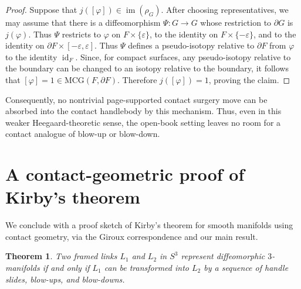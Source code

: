 \documentclass{amsart}
\numberwithin{equation}{section}
\numberwithin{figure}{section}
\newtheorem{theorem}{Theorem}[section]
\theoremstyle{definition}
\theoremstyle{remark}
\DeclareMathOperator{\id}{id}
\newcommand{\MCG}{\mathrm{MCG}}
\begin{document}
\begin{proof}
Suppose that \(j([\varphi])\in \operatorname{im}(\rho_G)\). After choosing representatives, we may assume that there is a diffeomorphism \(\Psi\colon G\to G\) whose restriction to \(\partial G\) is \(j(\varphi)\). Thus \(\Psi\) restricts to \(\varphi\) on \(F\times\{\varepsilon\}\), to the identity on \(F\times\{-\varepsilon\}\), and to the identity on \(\partial F\times[-\varepsilon,\varepsilon]\). Thus $\Psi$ defines a pseudo-isotopy relative to $\partial F$ from $\varphi$ to the identity $\id_F$. Since, for compact surfaces, any pseudo-isotopy relative to the boundary can be changed to an isotopy relative to the boundary, it follows that \([\varphi]=1\in\MCG(F,\partial F)\). Therefore \(j([\varphi])=1\), proving the claim.
\end{proof}

Consequently, no nontrivial page-supported contact surgery move can be absorbed into the contact handlebody by this mechanism. Thus, even in this weaker Heegaard-theoretic sense, the open-book setting leaves no room for a contact analogue of blow-up or blow-down.

\appendix


\section{A contact-geometric proof of Kirby's theorem}\label{sec:top_Kirby}

We conclude with a proof sketch of Kirby's theorem for smooth manifolds using contact geometry, via the Giroux correspondence and our main result.

\begin{theorem}
    Two framed links $L_1$ and $L_2$ in $S^3$ represent diffeomorphic $3$-manifolds if and only if $L_1$ can be transformed into $L_2$ by a sequence of handle slides, blow-ups, and blow-downs.
\end{theorem}
\end{document}
